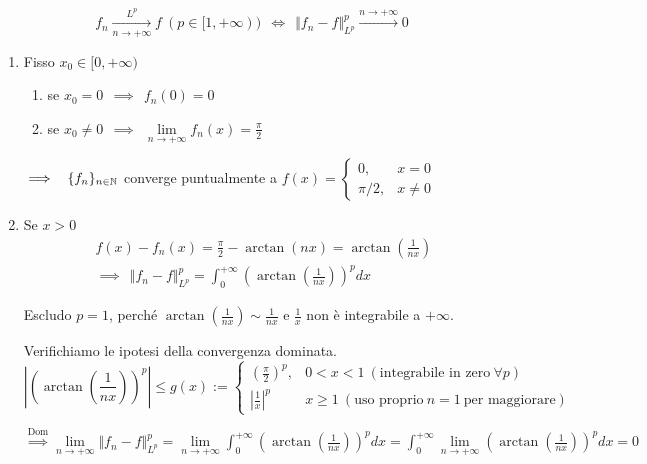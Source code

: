 \Soluzione
\begin{defn}
\begin{equation*}
f_{n}\xrightarrow[n\rightarrow +\infty ]{L^{p}} f\ ( p\in [ 1,+\infty )) \ \ \iff \ \ \Vert f_{n} -f\Vert ^{p}_{L^{p}}\xrightarrow{n\rightarrow +\infty } 0
\end{equation*}
\end{defn}
\begin{enumerate}
\item Fisso $x_{0} \in [ 0,+\infty )$
\begin{enumerate}
\item se $x_{0} =0\ \ \implies \ \ f_{n}( 0) =0$
\item se $x_{0} \neq 0\ \ \implies \ \ \lim\limits _{n\rightarrow +\infty } f_{n}( x) =\frac{\pi }{2}$
\end{enumerate}

$\implies \ \ \{f_{n}\}_{n\in \mathbb{N} }$ converge puntualmente a $f( x) =\begin{cases}
0, & x=0\\
\pi /2, & x\neq 0
\end{cases}$

\item Se $x >0$\begin{gather*}
f( x) -f_{n}( x) =\frac{\pi }{2} -\arctan( nx) =\arctan\left(\frac{1}{nx}\right)\\
\implies \ \ \Vert f_{n} -f\Vert ^{p}_{L^{p}} =\int ^{+\infty }_{0}\left(\arctan\left(\frac{1}{nx}\right)\right)^{p} dx
\end{gather*}

Escludo $p=1$, perché $\arctan\left(\frac{1}{nx}\right) \sim \frac{1}{nx}$ e $\frac{1}{x}$ non è integrabile a $+\infty $.

Verifichiamo le ipotesi della convergenza dominata.\begin{equation*}
\left| \left(\arctan\left(\frac{1}{nx}\right)\right)^{p}\right| \leqslant g( x) :=\begin{cases}
\left(\frac{\pi }{2}\right)^{p} , & 0< x< 1\ \left(\text{integrabile in zero} \ \forall p\right)\\
\left| \frac{1}{x}\right| ^{p} & x\geqslant 1\ \left(\text{uso proprio} \ n=1\ \text{per maggiorare}\right)
\end{cases}
\end{equation*}

$\overset{\text{Dom}}{\implies }\lim\limits _{n\rightarrow +\infty }\Vert f_{n} -f\Vert ^{p}_{L^{p}} =\lim\limits _{n\rightarrow +\infty }\int ^{+\infty }_{0}\left(\arctan\left(\frac{1}{nx}\right)\right)^{p} dx=\int ^{+\infty }_{0}\lim\limits _{n\rightarrow +\infty }\left(\arctan\left(\frac{1}{nx}\right)\right)^{p} dx=0$
\end{enumerate}
